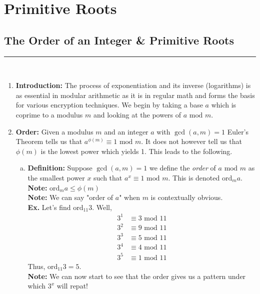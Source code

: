 \documentclass[class=article, crop=false]{standalone}
\begin{document}
\setcounter{section}{8}
\section{Primitive Roots}
\subsection{The Order of an Integer \& Primitive Roots}
\rule{\textwidth}{1pt}\\
\begin{enumerate}
\item \textbf{Introduction:} 
The process of exponentiation and its inverse (logarithms) is as essential in modular arithmetic as it 
is in regular math and forms the basis for various encryption techniques. We begin by taking a base $a$
which is coprime to a modulus $m$ and looking at the powers of $a\mbox{ mod }m$.

\item \textbf{Order:}
Given a modulus $m$ and an integer $a$ with $\gcd(a,m)=1$ Euler's Theorem tells us that
$a^{\phi(m)} \equiv 1\mbox{ mod }m$. It does not however tell us that $\phi(m)$ is the lowest
power which yields 1. This leads to the following.
\begin{enumerate}[(a)]
	\item \textbf{Definition:} Suppose $\gcd(a,m)=1$ we define the \emph{order} of $a\mbox{ mod }m$
	as the smallest power $x$ such that $a^x \equiv 1\mbox{ mod }m$. This is denoted $\mbox{ord}_m a$. \\
	\textbf{Note:} $\mbox{ord}_m a \leq \phi(m)$ \\
	\textbf{Note:} We can say "order of $a$" when $m$ is contextually obvious.\\
	\textbf{Ex.} Let's find $\mbox{ord}_{11} 3$. Well,
	\begin{align*}
		3^1 &\equiv 3\mbox{ mod }11 \\
		3^2 &\equiv 9\mbox{ mod }11 \\
		3^3 &\equiv 5\mbox{ mod }11 \\
		3^4 &\equiv 4\mbox{ mod }11 \\
		3^5 &\equiv 1\mbox{ mod }11
	\end{align*}
	Thus, $\mbox{ord}_{11} 3 = 5$. \\
	\textbf{Note:} We can now start to see that the order gives us a pattern under which
	$3^x$ will repat!
	

\end{enumerate}
\end{enumerate}
\end{document}
